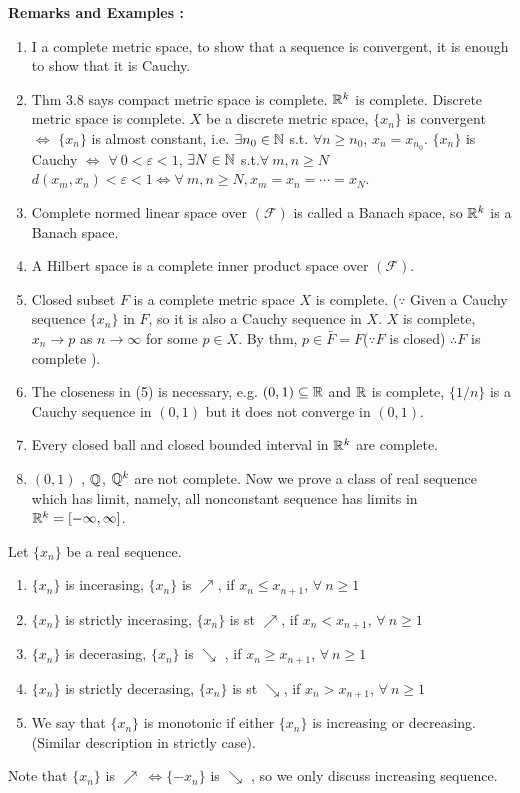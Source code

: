 	\textbf{Remarks and Examples : }
	\begin{enumerate}
	\item I a complete metric space, to show that a sequence is convergent, it is enough to show that it is Cauchy.
\item Thm 3.8 says compact metric space is complete. $\mathbb{R}^k$ is complete. Discrete metric space is complete. $X$ be a discrete metric space, $\{x_n\}$ is convergent $\Leftrightarrow$ $\{x_n\}$ is almost constant, i.e. $\exists n_0\in\mathbb{N}$ s.t. $\forall n\geq n_0$, $x_n = x_{n_0}$. $\{x_n\}$ is Cauchy $\Leftrightarrow$ $\forall\ 0 < \varepsilon < 1$, $\exists N \in \mathbb{N}$ s.t.$\forall\ m,n \geq N$  $d(x_m,x_n) < \varepsilon < 1 \Leftrightarrow \forall\ m,n \geq N, x_m = x_{n} = \cdots = x_N$.
\item Complete normed linear space over $(\mathcal{F})$ is called a Banach space, so $\mathbb{R}^k$ is a Banach space.
\item A Hilbert space is a complete inner product space over $(\mathcal{F})$.
\item Closed subset $F$ is a complete metric space $X$ is complete. ($\because $ Given a Cauchy sequence $\{x_n\}$ in $F$, so it is also a Cauchy sequence in $X$. $X$ is complete, $x_n\to p$ as $n\to \infty$ for some $p\in X$. By thm, $p\in\bar{F} = F$($\because F$ is closed) $\therefore F$ is complete ).
\item The closeness in (5) is necessary, e.g. $(0,1) \subseteq \mathbb{R}$ and $\mathbb{R}$ is complete, $\{1/n\}$ is a Cauchy sequence in $(0,1)$ but it does not converge in $(0,1)$.
\item Every closed ball and closed bounded interval in $\mathbb{R}^k$ are complete.
\item $(0,1)$ , $\mathbb{Q}$, $\mathbb{Q}^k$ are not complete. Now we prove a class of real sequence which has limit, namely, all nonconstant sequence has limits in $\mathbb{R}^k = [-\infty ,\infty]$.
	\end{enumerate}

\begin{defn}
Let $\{x_n\}$ be a real sequence.
	\begin{enumerate}
	\item $\{x_n\}$ is incerasing, $\{x_n\}$ is $\nearrow$, if $x_n \leq x_{n+1}$, $\forall\ n\geq 1$
\item  $\{x_n\}$ is strictly incerasing, $\{x_n\}$ is st $\nearrow$, if $x_n < x_{n+1}$, $\forall\ n\geq 1$
\item  $\{x_n\}$ is decerasing, $\{x_n\}$ is $\searrow$ , if $x_n \geq x_{n+1}$, $\forall\ n\geq 1$
\item  $\{x_n\}$ is strictly decerasing, $\{x_n\}$ is st $\searrow$, if $x_n > x_{n+1}$, $\forall\ n\geq 1$
\item We say that $\{x_n\}$ is monotonic if either $\{x_n\}$ is increasing or decreasing. (Similar description in strictly case).
	\end{enumerate}
\end{defn}
Note that $\{x_n\}$ is $\nearrow\ \Leftrightarrow \{-x_n\}$ is $\searrow$ , so we only discuss increasing sequence. 

